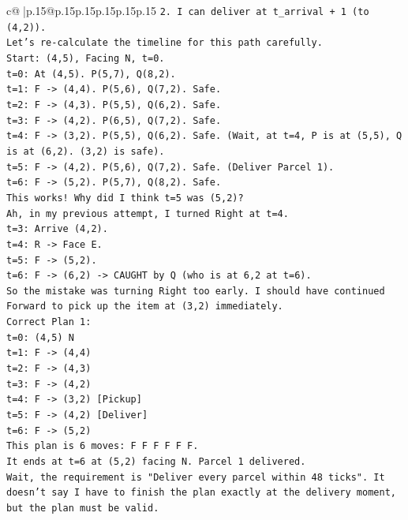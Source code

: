 \documentclass{article}
\begin{document}
{\begin{supertabular}{c@{$\;$}|p{.15\linewidth}@{}p{.15\linewidth}p{.15\linewidth}p{.15\linewidth}p{.15\linewidth}p{.15\linewidth}}
{{{\texttt{2. I can deliver at t\_arrival + 1 (to (4,2)).} \\
\texttt{Let's re{-}calculate the timeline for this path carefully.} \\
\texttt{Start: (4,5), Facing N, t=0.} \\
\texttt{t=0: At (4,5). P(5,7), Q(8,2).} \\
\texttt{t=1: F {-}> (4,4). P(5,6), Q(7,2). Safe.} \\
\texttt{t=2: F {-}> (4,3). P(5,5), Q(6,2). Safe.} \\
\texttt{t=3: F {-}> (4,2). P(6,5), Q(7,2). Safe.} \\
\texttt{t=4: F {-}> (3,2). P(5,5), Q(6,2). Safe. (Wait, at t=4, P is at (5,5), Q is at (6,2). (3,2) is safe).} \\
\texttt{t=5: F {-}> (4,2). P(5,6), Q(7,2). Safe. (Deliver Parcel 1).} \\
\texttt{t=6: F {-}> (5,2). P(5,7), Q(8,2). Safe.} \\
\texttt{This works! Why did I think t=5 was (5,2)?} \\
\texttt{Ah, in my previous attempt, I turned Right at t=4.} \\
\texttt{t=3: Arrive (4,2).} \\
\texttt{t=4: R {-}> Face E.} \\
\texttt{t=5: F {-}> (5,2).} \\
\texttt{t=6: F {-}> (6,2) {-}> CAUGHT by Q (who is at 6,2 at t=6).} \\
\texttt{So the mistake was turning Right too early. I should have continued Forward to pick up the item at (3,2) immediately.} \\
\texttt{Correct Plan 1:} \\
\texttt{t=0: (4,5) N} \\
\texttt{t=1: F {-}> (4,4)} \\
\texttt{t=2: F {-}> (4,3)} \\
\texttt{t=3: F {-}> (4,2)} \\
\texttt{t=4: F {-}> (3,2) {[}Pickup{]}} \\
\texttt{t=5: F {-}> (4,2) {[}Deliver{]}} \\
\texttt{t=6: F {-}> (5,2)} \\
\texttt{This plan is 6 moves: F F F F F F.} \\
\texttt{It ends at t=6 at (5,2) facing N. Parcel 1 delivered.} \\
\texttt{Wait, the requirement is "Deliver every parcel within 48 ticks". It doesn't say I have to finish the plan exactly at the delivery moment, but the plan must be valid.} \\
}}}
\end{supertabular}}
\end{document}

